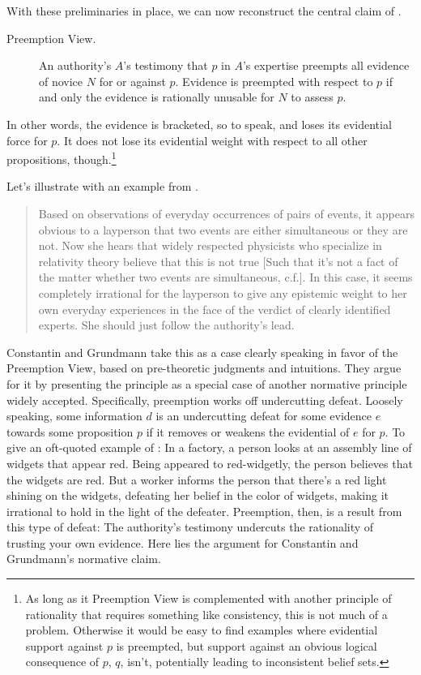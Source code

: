 \documentclass[11pt, a4paper]{scrartcl}
\begin{document}
With these preliminaries in place, we can now reconstruct the central claim of \textcite{Constantin2017}. 
\begin{description}
    \item[Preemption View.] An authority's $A$'s testimony that $p$ in $A$'s expertise preempts all evidence of novice $N$ for or against $p$. Evidence is preempted with respect to $p$ if and only the evidence is rationally unusable for $N$ to assess $p$. 
\end{description}

In other words, the evidence is bracketed, so to speak, and loses its evidential force for $p$. It does not lose its evidential weight with respect to all other propositions, though.\footnote{As long as it Preemption View is complemented with another principle of rationality that requires something like consistency, this is not much of a problem. Otherwise it would be easy to find examples where evidential support against $p$ is preempted, but support against an obvious logical consequence of $p$, $q$, isn't, potentially leading to inconsistent belief sets.} 

Let's illustrate with an example from \textcite{Constantin2017}. 

\begin{singlespacing}
\begin{quote}
    Based on observations of everyday occurrences of pairs of events, it appears obvious to a layperson that two events are either simultaneous or they are not. Now she hears that widely respected physicists who specialize in relativity theory believe that this is not true [Such that it's not a fact of the matter whether two events are simultaneous, c.f.]. In this case, it seems completely irrational for the layperson to give any epistemic weight to her own everyday experiences in the face of the verdict of clearly identified experts. She should just follow the authority's lead. 
\end{quote}
\end{singlespacing}

Constantin and Grundmann take this as a case clearly speaking in favor of the Preemption View, based on pre-theoretic judgments and intuitions. They argue for it by presenting the principle as a special case of another normative principle widely accepted. Specifically, preemption works off undercutting defeat. Loosely speaking, some information $d$ is an undercutting defeat for some evidence $e$ towards some proposition $p$ if it removes or weakens the evidential of $e$ for $p$. To give an oft-quoted example of \textcite{Pollock1986}: In a factory, a person looks at an assembly line of widgets that appear red. Being appeared to red-widgetly, the person believes that the widgets are red. But a worker informs the person that there's a red light shining on the widgets, defeating her belief in the color of widgets, making it irrational to hold in the light of the defeater. Preemption, then, is a result from this type of defeat: The authority's testimony undercuts the rationality of trusting your own evidence. Here lies the argument for Constantin and Grundmann's normative claim.
\end{document}
